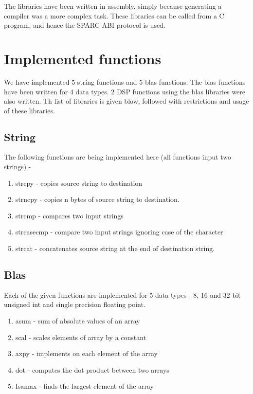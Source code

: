 \documentclass[12pt]{article}
\begin{document}
The libraries have been written in assembly, simply because generating a compiler was a more complex task.
These libraries can be called from a C program, and hence the SPARC ABI protocol is used.

\section{Implemented functions}
We have implemented 5 string functions and 5 blas functions. The blas functions have been written for 4 data types. 2 DSP functions using the blas libraries were also written.
Th list of libraries is given blow, followed with restrictions and usage of these libraries.


\subsection{String}
The following functions are being implemented here (all functions input two strings) - 
\begin{enumerate}
    \item strcpy - copies source string to destination 
    \item strncpy - copies n bytes of source string to destination.
    \item strcmp  - compares two input strings
    \item strcasecmp - compare two input strings ignoring case of the character
    \item strcat  - concatenates source string at the end of destination string.
\end{enumerate}

\subsection{Blas}
  
Each of the given functions are implemented for 5 data types - 8, 16 and 32 bit unsigned int and single precision floating point.
\begin{enumerate}
    \item asum - sum of absolute values of an array
    \item scal - scales elements of array by a constant
    \item axpy - implements  on each element of the array
    \item dot -  computes the dot product between two arrays
    \item Isamax - finds the largest element of the array
\end{enumerate}\
\end{document}
